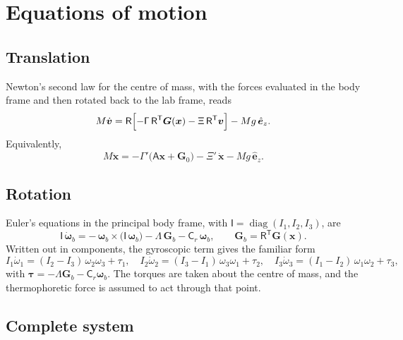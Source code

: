 \documentclass[11pt]{article}
\newcommand{\vect}[1]{\bm{#1}}
\newcommand{\tens}[1]{\mathsf{#1}}
\newcommand{\ez}{\hat{\vect{e}}_z}
\newcommand{\Rm}{\tens{R}}
\newcommand{\Gl}{\vect{G}}
\newcommand{\Gb}{\vect{G}_{b}}
\newcommand{\T}{^{\mathsf{T}}}
\theoremstyle{remark}
\begin{document}
\section{Equations of motion}

\subsection{Translation}

Newton's second law for the centre of mass, with the forces evaluated in
the body frame and then rotated back to the lab frame, reads
\begin{equation}
  M\dot{\vect{v}}
  = \Rm\Bigl[-\tens{\Gamma}\,\Rm\T\Gl(\vect{x}) - \tens{\Xi}\,\Rm\T\vect{v}\Bigr]
    - Mg\,\ez .
  \label{eq:trans}
\end{equation}
Equivalently,
\begin{equation}
  M\ddot{\vect{x}}
  = -\tens{\Gamma}'\bigl(\tens{A}\vect{x}+\Gl_0\bigr)
    - \tens{\Xi}'\,\dot{\vect{x}} - Mg\,\ez .
\end{equation}

\subsection{Rotation}

Euler's equations in the principal body frame, with
$\tens{I}=\operatorname{diag}(I_1,I_2,I_3)$, are
\begin{equation}
  \tens{I}\,\dot{\vect{\omega}}_b
  = -\,\vect{\omega}_b\times\bigl(\tens{I}\,\vect{\omega}_b\bigr)
    - \tens{\Lambda}\,\Gb - \tens{C}_r\,\vect{\omega}_b ,
  \qquad \Gb = \Rm\T\Gl(\vect{x}).
  \label{eq:rot}
\end{equation}
Written out in components, the gyroscopic term gives the familiar form
\begin{equation}
  I_1\dot\omega_1 = (I_2-I_3)\,\omega_2\omega_3 + \tau_1,\quad
  I_2\dot\omega_2 = (I_3-I_1)\,\omega_3\omega_1 + \tau_2,\quad
  I_3\dot\omega_3 = (I_1-I_2)\,\omega_1\omega_2 + \tau_3,
\end{equation}
with $\vect{\tau} = -\tens{\Lambda}\Gb - \tens{C}_r\vect{\omega}_b$.
The torques are taken about the centre of mass, and the thermophoretic
force is assumed to act through that point.

\subsection{Complete system}
\end{document}
